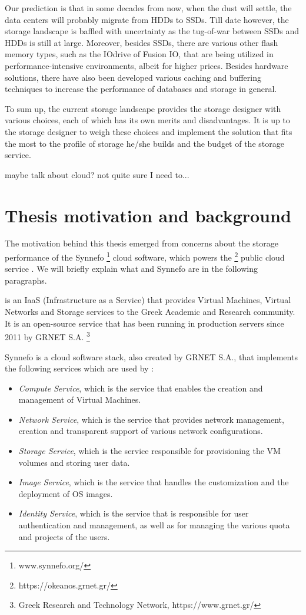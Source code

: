 Our prediction is that in some decades from now, when the dust will settle, the 
data centers will probably migrate from HDDs to SSDs. Till date however, the 
storage landscape is baffled with uncertainty as the tug-of-war between SSDs 
and HDDs is still at large. Moreover, besides SSDs, there are various other 
flash memory types, such as the IOdrive of Fusion IO, that are being utilized 
in performance-intensive environments, albeit for higher prices. Besides 
hardware solutions, there have also been developed various caching and 
buffering techniques to increase the performance of databases and storage in 
general.

To sum up, the current storage landscape provides the storage designer with 
various choices, each of which has its own merits and disadvantages. It is up 
to the storage designer to weigh these choices and implement the solution that 
fits the most to the profile of storage he/she builds and the budget of the 
storage service.

\todo maybe talk about cloud? not quite sure I need to...

\section{Thesis motivation and background}

The motivation behind this thesis emerged from concerns about the storage 
performance of the Synnefo
\footnote{www.synnefo.org/} cloud software, which powers the \okeanos
\footnote{https://okeanos.grnet.gr/} public cloud service \cite{okeanos}. We 
will briefly explain what \okeanos and Synnefo are in the following paragraphs.

\okeanos is an IaaS (Infrastructure as a Service) that provides Virtual 
Machines, Virtual Networks and Storage services to the Greek Academic and 
Research community. It is an open-source service that has been running in 
production servers since 2011 by GRNET S.A.
\footnote{Greek Research and Technology Network, https://www.grnet.gr/}

Synnefo is a cloud software stack, also created by GRNET S.A., that implements 
the following services which are used by \okeanos:

\begin{itemize}
	\item \textit{Compute Service}, which is the service that enables the 
		creation and management of Virtual Machines.
	\item \textit{Network Service}, which is the service that provides network 
		management, creation and transparent support of various network 
		configurations.
	\item \textit{Storage Service}, which is the service responsible for 
		provisioning the VM volumes and storing user data.
	\item \textit{Image Service}, which is the service that handles the 
		customization and the deployment of OS images.
	\item \textit{Identity Service}, which is the service that is responsible 
		for user authentication and management, as well as for managing the 
		various quota and projects of the users.
\end{itemize}


